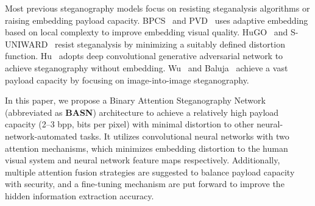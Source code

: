 Most previous steganography models focus on resisting steganalysis algorithms or raising embedding payload capacity. BPCS~\cite{BPCS2002,BPCS2015} and PVD~\cite{PVD,PVD_LSB,PVD_Mod} uses adaptive embedding based on local complexty to improve embedding visual quality. HuGO~\cite{HUGO} and S-UNIWARD~\cite{S_UNIWARD} resist steganalysis by minimizing a suitably defined distortion function. Hu~\cite{GANStego} adopts deep convolutional generative adversarial network to achieve steganography without embedding. Wu~\cite{StegNet} and Baluja~\cite{HIPS} achieve a vast payload capacity by focusing on image-into-image steganography.

In this paper, we propose a Binary Attention Steganography Network (abbreviated as \textbf{BASN}) architecture to achieve a relatively high payload capacity (2--3 bpp, bits per pixel) with minimal distortion to other neural-network-automated tasks. It utilizes convolutional neural networks with two attention mechanisms, which minimizes embedding distortion to the human visual system and neural network feature maps respectively. Additionally, multiple attention fusion strategies are suggested to balance payload capacity with security, and a fine-tuning mechanism are put forward to improve the hidden information extraction accuracy.
